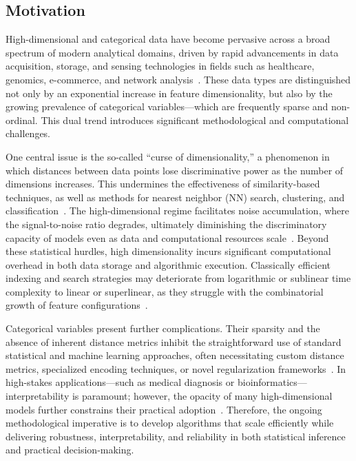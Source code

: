 \documentclass[11pt]{article}
\begin{document}
\subsection{Motivation}

High-dimensional and categorical data have become pervasive across a broad spectrum of modern analytical domains, driven by rapid advancements in data acquisition, storage, and sensing technologies in fields such as healthcare, genomics, e-commerce, and network analysis~\cite{ref1, ref2, ref5, ref6, ref11, ref12, ref30, ref32, ref36, ref37, ref38, ref39, ref42, ref43, ref46, ref52, ref71, ref72, ref73, ref76, ref90, ref93, ref96, ref110}. These data types are distinguished not only by an exponential increase in feature dimensionality, but also by the growing prevalence of categorical variables—which are frequently sparse and non-ordinal. This dual trend introduces significant methodological and computational challenges.

One central issue is the so-called ``curse of dimensionality,'' a phenomenon in which distances between data points lose discriminative power as the number of dimensions increases. This undermines the effectiveness of similarity-based techniques, as well as methods for nearest neighbor (NN) search, clustering, and classification~\cite{ref1, ref5, ref12, ref36, ref76, ref110}. The high-dimensional regime facilitates noise accumulation, where the signal-to-noise ratio degrades, ultimately diminishing the discriminatory capacity of models even as data and computational resources scale~\cite{ref12, ref36, ref39, ref46}. Beyond these statistical hurdles, high dimensionality incurs significant computational overhead in both data storage and algorithmic execution. Classically efficient indexing and search strategies may deteriorate from logarithmic or sublinear time complexity to linear or superlinear, as they struggle with the combinatorial growth of feature configurations~\cite{ref2, ref5, ref32, ref43, ref90}.

Categorical variables present further complications. Their sparsity and the absence of inherent distance metrics inhibit the straightforward use of standard statistical and machine learning approaches, often necessitating custom distance metrics, specialized encoding techniques, or novel regularization frameworks~\cite{ref39, ref52, ref71, ref72, ref73, ref93}. In high-stakes applications—such as medical diagnosis or bioinformatics—interpretability is paramount; however, the opacity of many high-dimensional models further constrains their practical adoption~\cite{ref11, ref37, ref46, ref96, ref110}. Therefore, the ongoing methodological imperative is to develop algorithms that scale efficiently while delivering robustness, interpretability, and reliability in both statistical inference and practical decision-making.
\end{document}
